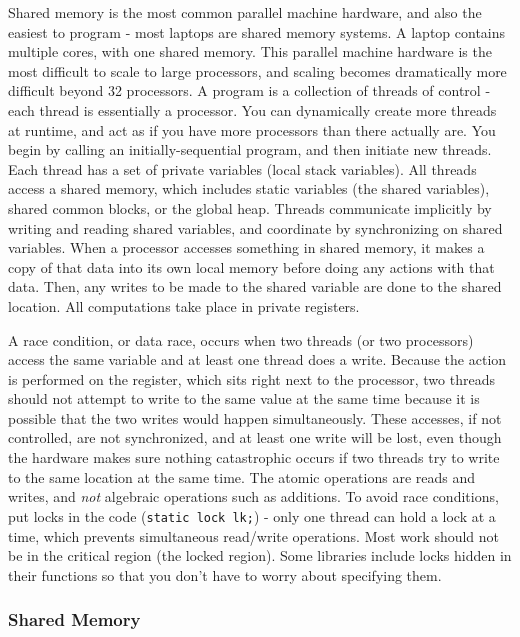 \documentclass[10pt]{article}
\begin{document}
\begin{flushleft}
Shared memory is the most common parallel machine hardware, and also the easiest to program - most laptops are shared memory systems. A laptop contains multiple cores, with one shared memory. This parallel machine hardware is the most difficult to scale to large processors, and scaling becomes dramatically more difficult beyond 32 processors. A program is a collection of threads of control - each thread is essentially a processor. You can dynamically create more threads at runtime, and act as if you have more processors than there actually are. You begin by calling an initially-sequential program, and then initiate new threads. Each thread has a set of private variables (local stack variables). All threads access a shared memory, which includes static variables (the shared variables), shared common blocks, or the global heap. Threads communicate implicitly by writing and reading shared variables, and coordinate by synchronizing on shared variables. When a processor accesses something in shared memory, it makes a copy of that data into its own local memory before doing any actions with that data. Then, any writes to be made to the shared variable are done to the shared location. All computations take place in private registers.

A race condition, or data race, occurs when two threads (or two processors) access the same variable and at least one thread does a write. Because the action is performed on the register, which sits right next to the processor, two threads should not attempt to write to the same value at the same time because it is possible that the two writes would happen simultaneously. These accesses, if not controlled, are not synchronized, and at least one write will be lost, even though the hardware makes sure nothing catastrophic occurs if two threads try to write to the same location at the same time. The atomic operations are reads and writes, and \textit{not} algebraic operations such as additions. To avoid race conditions, put locks in the code ({\tt static lock lk;}) - only one thread can hold a lock at a time, which prevents simultaneous read/write operations. Most work should not be in the critical region (the locked region). Some libraries include locks hidden in their functions so that you don't have to worry about specifying them.

\subsubsection{Shared Memory}


\end{flushleft}
\end{document}
